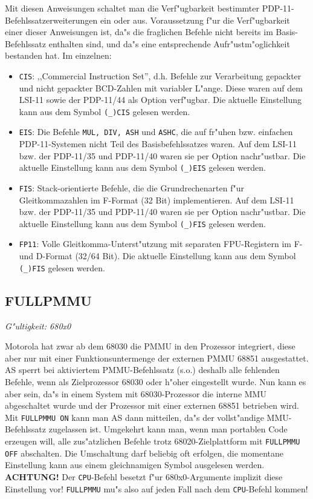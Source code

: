 \documentclass[12pt,a4paper,twoside]{report}
\makeatletter
\newcommand{\bb}[1]{{\bf #1}}
\newcommand{\tty}[1]{{\tt #1}}
\newcommand{\ttindex}[1]{\index{#1@{\tt #1}}}
\newcommand{\asname}{AS}
\newcommand{\predefsym}[1]{{\tt (\_)#1}}
\makeatother
\begin{document}
Mit diesen Anweisungen schaltet man die Verf"ugbarkeit bestimmter
PDP-11-Befehlssatzerweiterungen ein oder aus.  Voraussetzung f"ur die
Verf"ugbarkeit einer dieser Anweisungen ist, da"s die fraglichen Befehle
nicht bereits im Basis-Befehlssatz enthalten sind, und da"s eine
entsprechende Aufr"ustm"oglichkeit bestanden hat.  Im einzelnen:
\begin{itemize}
\item{{\tt CIS}: ,,Commercial Instruction Set'', d.h. Befehle zur
      Verarbeitung gepackter und nicht gepackter BCD-Zahlen mit
      variabler L"ange.  Diese waren auf dem LSI-11 sowie der
      PDP-11/44 als Option verf"ugbar.  Die aktuelle Einstellung
      kann aus dem Symbol \predefsym{CIS} gelesen werden.}
\item{{\tt EIS}: Die Befehle {\tt MUL, DIV, ASH} und {\tt ASHC},
      die auf fr"uhen bzw. einfachen PDP-11-Systemen nicht Teil
      des Basisbefehlssatzes waren.  Auf dem LSI-11 bzw. der
      PDP-11/35 und PDP-11/40 waren sie per Option nachr"ustbar.
      Die aktuelle Einstellung kann aus dem Symbol \predefsym{EIS}
      gelesen werden.}
\item{{\tt FIS}: Stack-orientierte Befehle, die die Grundrechenarten
      f"ur Gleitkommazahlen im F-Format (32 Bit) implementieren.
      Auf dem LSI-11 bzw. der PDP-11/35 und PDP-11/40 waren sie
      per Option nachr"ustbar.  Die aktuelle Einstellung kann aus
      dem Symbol \predefsym{FIS} gelesen werden.}
\item{{\tt FP11}: Volle Gleitkomma-Unterst"utzung mit separaten
      FPU-Registern im F- und D-Format (32/64 Bit).  Die aktuelle
      Einstellung kann aus dem Symbol \predefsym{FIS} gelesen werden.}
\end{itemize}


\subsection{FULLPMMU}
\ttindex{FULLPMMU}

{\em G"ultigkeit: 680x0}

Motorola hat zwar ab dem 68030 die PMMU in den Prozessor integriert,
diese aber nur mit einer Funktionsuntermenge der externen PMMU 68851
ausgestattet.  \asname{} sperrt bei aktiviertem PMMU-Befehlssatz (s.o.) deshalb
alle fehlenden Befehle, wenn als Zielprozessor 68030 oder h"oher
eingestellt wurde.  Nun kann es aber sein, da"s in einem System mit
68030-Prozessor die interne MMU abgeschaltet wurde und der Prozessor
mit einer externen 68851 betrieben wird.  Mit \tty{FULLPMMU ON} kann man
\asname{} dann mitteilen, da"s der vollst"andige MMU-Befehlssatz zugelassen
ist.  Umgekehrt kann man, wenn man portablen Code erzeugen will, alle
zus"atzlichen Befehle trotz 68020-Zielplattform mit \tty{FULLPMMU OFF}
abschalten.  Die Umschaltung darf beliebig oft erfolgen, die momentane
Einstellung kann aus einem gleichnamigen Symbol ausgelesen werden.
\bb{ACHTUNG!}  Der \tty{CPU}-Befehl besetzt f"ur 680x0-Argumente implizit
diese Einstellung vor!  \tty{FULLPMMU} mu"s also auf jeden Fall nach dem
\tty{CPU}-Befehl kommen!
\end{document}
